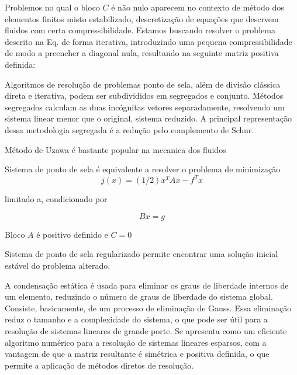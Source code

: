\documentclass[12pt]{article}
\begin{document}
Problemos no qual o bloco \(C\) é não nulo aparecem no contexto de método dos elementos finitos misto estabilizado, descretização de equações que descrvem fluidos com certa compressibilidade.
Estamos buscando resolver o problema descrito na Eq. de forma iterativa, introduzindo uma pequena compressibilidade de modo a preencher a 
diagonal nula, resultando na seguinte matriz positiva definida:



Algoritmos de resolução de problemas ponto de sela, além de divisão clássica direta e iterativa, podem ser subdivididos em segregados e conjunto. Métodos segregados calculam as duas incógnitas vetores separadamente, resolvendo um sistema linear menor que o original, sistema reduzido. A principal representação dessa metodologia segregada é a redução pelo complemento de Schur.
 

Método de Uzawa é bastante popular na mecanica dos fluidos 

Sistema de ponto de sela é equivalente a resolver o problema de minimização 
\begin{equation}
    j(x)=(1/2)x^TAx-f^Tx
    \label{eq:eq9}
\end{equation}

limitado a, condicionado por 

\begin{equation}
    Bx=g
    \label{eq:eq9}
\end{equation}

Bloco \(A\) é positivo definido e \(C=0\)



Sistema de ponto de sela regularizado permite encontrar uma solução inicial estável do problema alterado.

A condensação estática é usada para eliminar os graus de liberdade internos de um elemento, reduzindo o número de graus de liberdade do sistema global. Consiste, basicamente, de um processo de eliminação de Gauss.
Essa eliminação reduz o tamanho e a complexidade do sistema, o que pode ser útil para a resolução de sistemas lineares de grande porte.
Se apresenta como um eficiente algoritmo numérico para a resolução de sistemas lineares esparsos, com a vantagem de que a matriz resultante é 
simétrica e positiva definida, o que permite a aplicação de métodos diretos de resolução.
\end{document}
